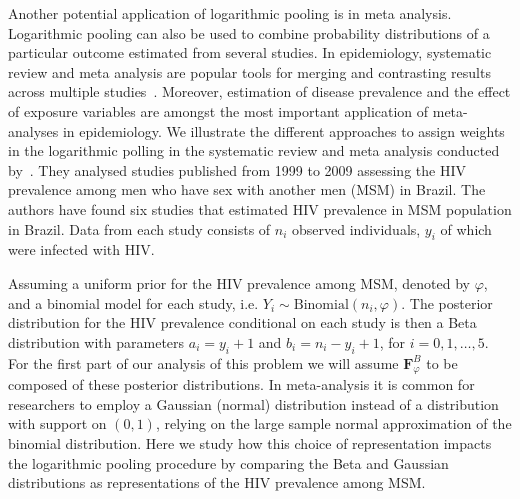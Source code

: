 \documentclass[a4paper, notitlepage, 11pt]{article}
\begin{document}
Another potential application of logarithmic pooling is in meta analysis.
Logarithmic pooling can also be used to combine probability distributions of a particular outcome estimated from several studies. 
In epidemiology, systematic review and meta analysis are popular tools for merging and contrasting results across multiple studies~\citep[Chapter 33]{Rothman2008}.
Moreover, estimation of disease prevalence and the effect of exposure variables are amongst the most important application of meta-analyses in epidemiology.
We illustrate the different approaches to assign weights in the logarithmic polling in the systematic review and meta analysis conducted by~\citet{Malta2010}. 
They analysed studies published from 1999 to 2009 assessing the HIV prevalence among men who have sex with another men (MSM) in Brazil. 
The authors have found six studies that estimated HIV prevalence in MSM population in Brazil. 
Data from each study consists of $n_i$ observed individuals, $y_i$ of which were infected with HIV.

Assuming a uniform prior for the HIV prevalence among MSM, denoted by $\varphi$, and a binomial model for each study, i.e. $Y_i \sim \text{Binomial}(n_i, \varphi)$. 
The posterior distribution for the HIV prevalence conditional on each study is then a Beta distribution with parameters $a_i = y_i + 1$ and $b_i = n_i - y_i + 1$, for $i=0,1, \ldots, 5$.
For the first part of our analysis of this problem we will assume $\boldsymbol F^{B}_\varphi$ to be composed of these posterior distributions.
In meta-analysis it is common for researchers to employ a Gaussian (normal) distribution instead of a distribution with support on $(0, 1)$, relying on the large sample normal approximation of the binomial distribution. 
Here we study how this choice of representation impacts the logarithmic pooling procedure by comparing the Beta and Gaussian distributions as representations of the HIV prevalence among MSM.
\end{document}
